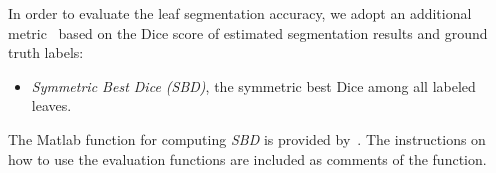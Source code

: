 In order to evaluate the leaf segmentation accuracy, we adopt an additional metric~\cite{scharr2014annotated} based on the Dice score of estimated segmentation results and ground truth labels:
\begin{itemize}
\item {\it{Symmetric Best Dice (SBD)}}, the symmetric best Dice among all labeled leaves.
\end{itemize}
The Matlab function for computing {\it{SBD}} is provided by~\cite{scharr2014annotated}.
The instructions on how to use the evaluation functions are included as comments of the function.


%




